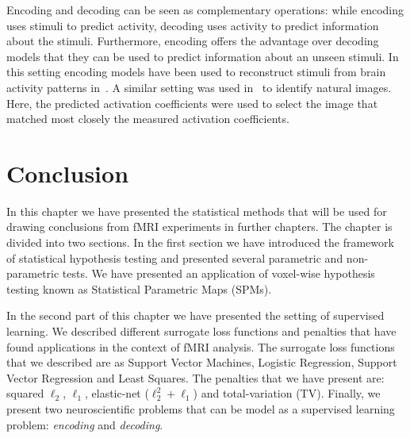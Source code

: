 Encoding and decoding can be seen as complementary operations: while encoding uses stimuli to predict activity,  decoding uses activity to predict information about the stimuli. Furthermore, encoding offers the advantage over decoding models that they can be used to predict information about an unseen stimuli. In this setting encoding models have been used to reconstruct stimuli from brain activity patterns in~\citep{miyawaki2008visual, naselaris2009bayesian, nishimoto2011reconstructing}. A similar setting was used in~\citep{Kay2008} to identify natural images. Here, the predicted activation coefficients were used to select the image that matched most closely the measured activation coefficients.



\section{Conclusion}

In this chapter we  have presented the statistical methods that will be used for drawing conclusions from fMRI experiments in further chapters. The chapter is divided into two sections. In the first section we have introduced the framework of statistical hypothesis testing and presented several parametric and non-parametric tests. We have presented an application of voxel-wise hypothesis testing known as Statistical Parametric Maps (SPMs).



In the second part of this chapter we have presented the setting of supervised learning. We described different surrogate loss functions and penalties that have found applications in the context of fMRI analysis. The surrogate loss functions that we described are  as Support Vector Machines, Logistic Regression, Support Vector Regression and Least Squares. The penalties that we have present are: squared $\ell_2$, $\ell_1$, elastic-net ($\ell_2^2 + \ell_1$) and total-variation (TV). Finally, we present two neuroscientific problems that can be model as a supervised learning problem: \emph{encoding} and \emph{decoding}.


\newpage


\begin{fullwidth}


\end{fullwidth}
